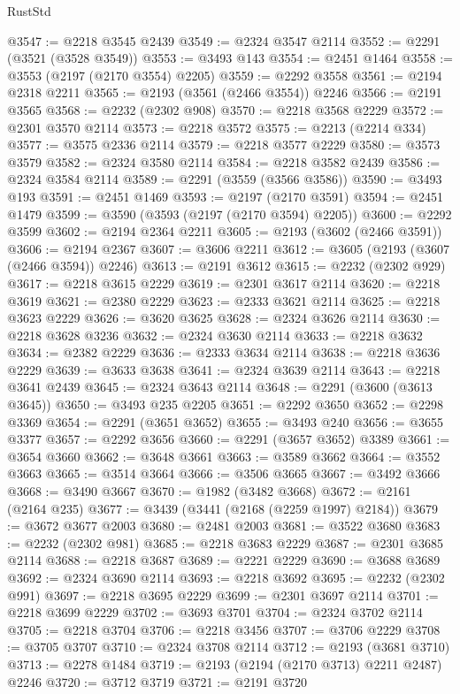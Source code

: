 \begin{lexlean}{RustStd}
\begin{coremodule}
{\begin{coremodule}
{{{{{{{{{{{{{{{{{{{{{{{{{{@3547 := @2218 @3545 @2439
@3549 := @2324 @3547 @2114
@3552 := @2291 (@3521 (@3528 @3549))
@3553 := @3493 @143
@3554 := @2451 @1464
@3558 := @3553 (@2197 (@2170 @3554) @2205)
@3559 := @2292 @3558
@3561 := @2194 @2318 @2211
@3565 := @2193 (@3561 (@2466 @3554)) @2246
@3566 := @2191 @3565
@3568 := @2232 (@2302 @908)
@3570 := @2218 @3568 @2229
@3572 := @2301 @3570 @2114
@3573 := @2218 @3572
@3575 := @2213 (@2214 @334)
@3577 := @3575 @2336 @2114
@3579 := @2218 @3577 @2229
@3580 := @3573 @3579
@3582 := @2324 @3580 @2114
@3584 := @2218 @3582 @2439
@3586 := @2324 @3584 @2114
@3589 := @2291 (@3559 (@3566 @3586))
@3590 := @3493 @193
@3591 := @2451 @1469
@3593 := @2197 (@2170 @3591)
@3594 := @2451 @1479
@3599 := @3590 (@3593 (@2197 (@2170 @3594) @2205))
@3600 := @2292 @3599
@3602 := @2194 @2364 @2211
@3605 := @2193 (@3602 (@2466 @3591))
@3606 := @2194 @2367
@3607 := @3606 @2211
@3612 := @3605 (@2193 (@3607 (@2466 @3594)) @2246)
@3613 := @2191 @3612
@3615 := @2232 (@2302 @929)
@3617 := @2218 @3615 @2229
@3619 := @2301 @3617 @2114
@3620 := @2218 @3619
@3621 := @2380 @2229
@3623 := @2333 @3621 @2114
@3625 := @2218 @3623 @2229
@3626 := @3620 @3625
@3628 := @2324 @3626 @2114
@3630 := @2218 @3628 @3236
@3632 := @2324 @3630 @2114
@3633 := @2218 @3632
@3634 := @2382 @2229
@3636 := @2333 @3634 @2114
@3638 := @2218 @3636 @2229
@3639 := @3633 @3638
@3641 := @2324 @3639 @2114
@3643 := @2218 @3641 @2439
@3645 := @2324 @3643 @2114
@3648 := @2291 (@3600 (@3613 @3645))
@3650 := @3493 @235 @2205
@3651 := @2292 @3650
@3652 := @2298 @3369
@3654 := @2291 (@3651 @3652)
@3655 := @3493 @240
@3656 := @3655 @3377
@3657 := @2292 @3656
@3660 := @2291 (@3657 @3652) @3389
@3661 := @3654 @3660
@3662 := @3648 @3661
@3663 := @3589 @3662
@3664 := @3552 @3663
@3665 := @3514 @3664
@3666 := @3506 @3665
@3667 := @3492 @3666
@3668 := @3490 @3667
@3670 := @1982 (@3482 @3668)
@3672 := @2161 (@2164 @235)
@3677 := @3439 (@3441 (@2168 (@2259 @1997) @2184))
@3679 := @3672 @3677 @2003
@3680 := @2481 @2003
@3681 := @3522 @3680
@3683 := @2232 (@2302 @981)
@3685 := @2218 @3683 @2229
@3687 := @2301 @3685 @2114
@3688 := @2218 @3687
@3689 := @2221 @2229
@3690 := @3688 @3689
@3692 := @2324 @3690 @2114
@3693 := @2218 @3692
@3695 := @2232 (@2302 @991)
@3697 := @2218 @3695 @2229
@3699 := @2301 @3697 @2114
@3701 := @2218 @3699 @2229
@3702 := @3693 @3701
@3704 := @2324 @3702 @2114
@3705 := @2218 @3704
@3706 := @2218 @3456
@3707 := @3706 @2229
@3708 := @3705 @3707
@3710 := @2324 @3708 @2114
@3712 := @2193 (@3681 @3710)
@3713 := @2278 @1484
@3719 := @2193 (@2194 (@2170 @3713) @2211 @2487) @2246
@3720 := @3712 @3719
@3721 := @2191 @3720
}}}}}}}}}}}}}}}}}}}}}}}}}}
\end{coremodule}}
\end{coremodule}
\end{lexlean}
